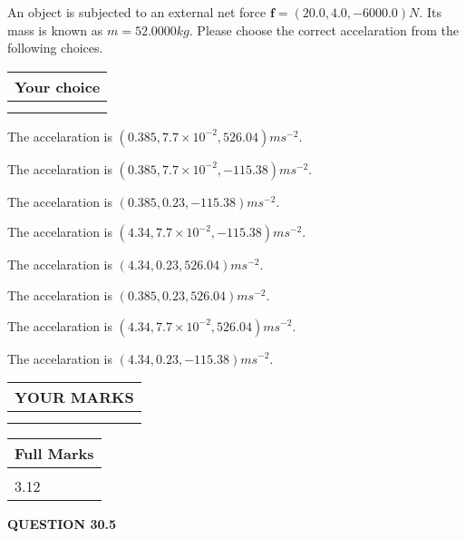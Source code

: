 \documentclass[12pt]{article}
\begin{document}
  
 
 
An object is subjected to an external net force $\mathbf{f}=
(20.0 , 4.0 , -6000.0) N$.
Its mass is known as $m= %
52.0000 kg$. Please choose the
correct accelaration from the following choices.
 
  
  
\noindent\hspace{3.0in} \begin{tabular}{|l|}
\hline
Your choice \\
\hline
 \\ 
 \\ 
\hline
\end{tabular}
  
  
 
 
The accelaration is $  %
(
0.385,
7.7 \times 10^{-2},
526.04)
ms^{-2} $.
 
 
The accelaration is $  %
(
0.385,
7.7 \times 10^{-2},
-115.38)
ms^{-2} $.
 
 
The accelaration is $  %
(
0.385,
0.23,
-115.38)
ms^{-2} $.
 
 
The accelaration is $  %
(
4.34,
7.7 \times 10^{-2},
-115.38)
ms^{-2} $.
 
 
The accelaration is $  %
(
4.34,
0.23,
526.04)
ms^{-2} $.
 
 
The accelaration is $  %
(
0.385,
0.23,
526.04)
ms^{-2} $.
 
 
The accelaration is $  %
(
4.34,
7.7 \times 10^{-2},
526.04)
ms^{-2} $.
 
 
The accelaration is $  %
(
4.34,
0.23,
-115.38)
ms^{-2} $.
 
 
 

 

 
\vspace{0.3in}
  
\vspace{0.2in}
  
\noindent\begin{tabular}{|l|}
\hline
 YOUR MARKS  \\
\hline
 \\ 
 \\ 
\hline
\end{tabular}
\hspace{0.05in} \begin{tabular}{|l|}
\hline
 Full Marks  \\
\hline
 \\ 
3.12 \\
\hline
\end{tabular}
{\textbf{\Large{QUESTION
30.5 
}}}
  
\end{document}
